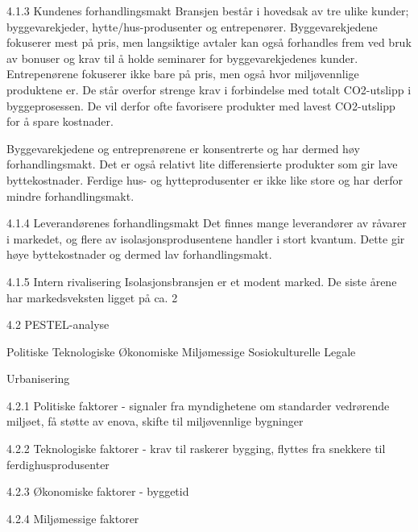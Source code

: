 4.1.3 Kundenes forhandlingsmakt
Bransjen består i hovedsak av tre ulike kunder; byggevarekjeder, hytte/hus-produsenter og entrepenører. Byggevarekjedene fokuserer mest på pris, men langsiktige avtaler kan også forhandles frem ved bruk av bonuser og krav til å holde seminarer for byggevarekjedenes kunder. Entrepenørene fokuserer ikke bare på pris, men også hvor miljøvennlige produktene er. De står overfor strenge krav i forbindelse med totalt CO2-utslipp i byggeprosessen. De vil derfor ofte favorisere produkter med lavest CO2-utslipp for å spare kostnader.
 
Byggevarekjedene og entreprenørene er konsentrerte og har dermed høy forhandlingsmakt. Det er også relativt lite differensierte produkter som gir lave byttekostnader. Ferdige hus- og hytteprodusenter er ikke like store og har derfor mindre forhandlingsmakt. 

4.1.4 Leverandørenes forhandlingsmakt
Det finnes mange leverandører av råvarer i markedet, og flere av isolasjonsprodusentene handler i stort kvantum. Dette gir høye byttekostnader og dermed lav forhandlingsmakt.

4.1.5 Intern rivalisering
Isolasjonsbransjen er et modent marked. De siste årene har markedsveksten ligget på ca. 2%

4.2 PESTEL-analyse


Politiske
Teknologiske
Økonomiske
Miljømessige
Sosiokulturelle
Legale








Urbanisering




4.2.1 Politiske faktorer - signaler fra myndighetene om standarder vedrørende miljøet, få støtte av enova, skifte til miljøvennlige bygninger

4.2.2 Teknologiske faktorer - krav til raskerer bygging, flyttes fra snekkere til ferdighusprodusenter 

4.2.3 Økonomiske faktorer - byggetid

4.2.4 Miljømessige faktorer

